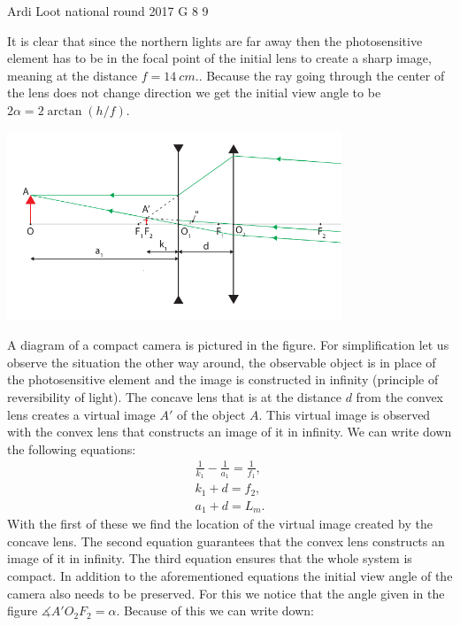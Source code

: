 \documentclass[11pt]{article}
\begin{document}
{Ardi Loot} %
{national round} %
{2017} %
{G 8} %
{9} %
{

\ifEngSolution
It is clear that since the northern lights are far away then the photosensitive element has to be in the focal point of the initial lens to create a sharp image, meaning at the distance $f=\SI{14}{cm}.$. Because the ray going through the center of the lens does not change direction we get the initial view angle to be $2\alpha=2\arctan\left(h/f\right)$.
\begin{center}
	\includegraphics[width=10cm]{2017-v3g-08-skeem__telephoto}
\end{center}
A diagram of a compact camera is pictured in the figure. For simplification let us observe the situation the other way around, the observable object is in place of the photosensitive element and the image is constructed in infinity (principle of reversibility of light). The concave lens that is at the distance $d$ from the convex lens creates a virtual image $A'$ of the object $A$. This virtual image is observed with the convex lens that constructs an image of it in infinity. We can write down the following equations:
\begin{eqnarray}
\frac{1}{k_{1}}-\frac{1}{a_{1}} = \frac{1}{f_{1}}, \label{2017-v3g-08-eq:telelens-eq1}\\
k_{1}+d = f_{2},\\
a_{1}+d = L_{m}.
\end{eqnarray}
With the first of these we find the location of the virtual image created by the concave lens. The second equation guarantees that the convex lens constructs an image of it in infinity. The third equation ensures that the whole system is compact. In addition to the aforementioned equations the initial view angle of the camera also needs to be preserved. For this we notice that the angle given in the figure $\measuredangle A'O_{2}F_{2}=\alpha$. Because of this we can write down:
}
\end{document}
